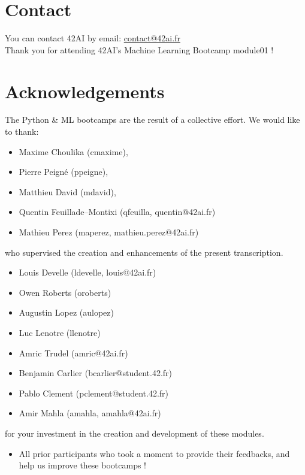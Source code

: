\section*{Contact}
You can contact 42AI by email: \href{mailto:contact@42ai.fr}{contact@42ai.fr}\\
\newline
Thank you for attending 42AI's Machine Learning Bootcamp module01 !

\section*{Acknowledgements}
The Python \& ML bootcamps are the result of a collective effort. We would like to thank:\\
\begin{itemize}
  \item Maxime Choulika (cmaxime),
  \item Pierre Peigné (ppeigne),
  \item Matthieu David (mdavid),
  \item Quentin Feuillade--Montixi (qfeuilla, quentin@42ai.fr)
  \item Mathieu Perez (maperez, mathieu.perez@42ai.fr)
\end{itemize}
who supervised the creation and enhancements of the present transcription.\\
\begin{itemize}
  \item Louis Develle (ldevelle, louis@42ai.fr)
  \item Owen Roberts (oroberts)
  \item Augustin Lopez (aulopez)
  \item Luc Lenotre (llenotre)
  \item Amric Trudel (amric@42ai.fr)
  \item Benjamin Carlier (bcarlier@student.42.fr)
  \item Pablo Clement (pclement@student.42.fr)
  \item Amir Mahla (amahla, amahla@42ai.fr)
\end{itemize}
for your investment in the creation and development of these modules.\\
\begin{itemize}
    \item All prior participants who took a moment to provide their feedbacks, and help us improve these bootcamps !
  \end{itemize}

\vfill
\doclicenseThis

